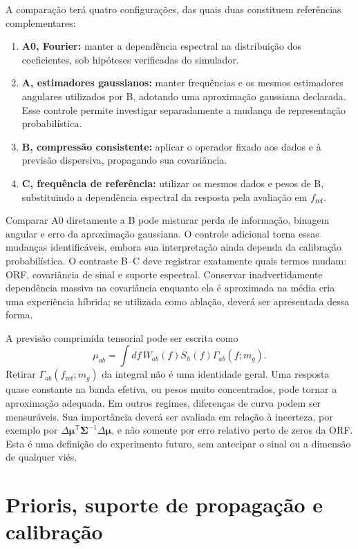 A comparação terá quatro configurações, das quais duas constituem
referências complementares:
\begin{enumerate}
 \item \textbf{A0, Fourier:} manter a dependência espectral na
 distribuição dos coeficientes, sob hipóteses verificadas do simulador.
 \item \textbf{A, estimadores gaussianos:} manter frequências e os mesmos
 estimadores angulares utilizados por B, adotando uma aproximação
 gaussiana declarada. Esse controle permite investigar separadamente a
 mudança de representação probabilística.
 \item \textbf{B, compressão consistente:} aplicar o operador fixado
 aos dados e à previsão dispersiva, propagando sua covariância.
 \item \textbf{C, frequência de referência:} utilizar os mesmos dados
 e pesos de B, substituindo a dependência espectral da resposta pela
 avaliação em \(f_{\mathrm{ref}}\).
\end{enumerate}

Comparar A0 diretamente a B pode misturar perda de informação,
binagem angular e erro da aproximação gaussiana. O controle adicional
torna essas mudanças identificáveis, embora sua interpretação ainda
dependa da calibração probabilística. O contraste B--C deve registrar
exatamente quais termos mudam: ORF, covariância de sinal e suporte
espectral. Conservar inadvertidamente dependência massiva na
covariância enquanto ela é aproximada na média cria uma experiência
híbrida; se utilizada como ablação, deverá ser apresentada dessa forma.

A previsão comprimida tensorial pode ser escrita como
\begin{equation}
 \mu_{ab}=\int df\,W_{ab}(f)S_h(f)\Gamma_{ab}(f;m_g).
 \label{eq:rev-previsao-integrada}
\end{equation}
Retirar \(\Gamma_{ab}(f_{\mathrm{ref}};m_g)\) da integral não é uma
identidade geral. Uma resposta quase constante na banda efetiva, ou
pesos muito concentrados, pode tornar a aproximação adequada. Em
outros regimes, diferenças de curva podem ser mensuráveis. Sua
importância deverá ser avaliada em relação à incerteza, por exemplo
por \(\Delta\boldsymbol\mu^\mathsf T\boldsymbol\Sigma^{-1}
\Delta\boldsymbol\mu\), e não somente por erro relativo perto de
zeros da ORF. Esta é uma definição do experimento futuro, sem
antecipar o sinal ou a dimensão de qualquer viés.

\section{Prioris, suporte de propagação e calibração}

